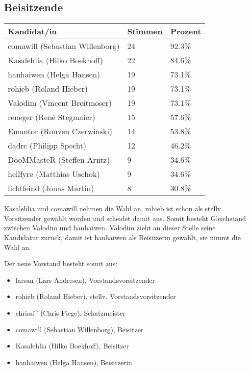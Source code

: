\documentclass[a4paper,12pt]{scrartcl}
\begin{document}
\subsection*{Beisitzende}
\begin{tabular}{|l|l|l|}
  \hline
  \textbf{Kandidat/in} & \textbf{Stimmen} & \textbf{Prozent} \\ \hline
  comawill (Sebastian Willenborg) & 24 & 92.3\% \\
  Kasalehlia (Hilko Boekhoff) & 22 & 84.6\% \\
  hanhaiwen (Helga Hansen) & 19 & 73.1\% \\
  rohieb (Roland Hieber) & 19 & 73.1\% \\
  Valodim (Vincent Breitmoser) & 19 & 73.1\% \\
  reneger (René Stegmaier) & 15 & 57.6\% \\
  Emantor (Rouven Czerwinski) & 14 & 53.8\% \\
  dadrc (Philipp Specht) & 12 & 46.2\% \\
  DooMMasteR (Steffen Arntz) & 9 & 34.6\% \\
  hellfyre (Matthias Uschok) & 9 & 34.6\% \\
  lichtfeind (Jonas Martin) & 8 & 30.8\% \\
  \hline
\end{tabular}

Kasalehlia und comawill nehmen die Wahl an, rohieb ist schon als stellv.
Vorsitzender gewählt worden und scheidet damit aus. Somit besteht Gleichstand
zwischen Valodim und hanhaiwen. Valodim zieht an dieser Stelle seine Kandidatur
zurück, damit ist hanhaiwen als Beisitzerin gewählt, sie nimmt die Wahl an.

Der neue Vorstand besteht somit aus:
\begin{itemize}
  \item larsan (Lars Andresen), Vorstandsvorsitzender
  \item rohieb (Roland Hieber), stellv. Vorstandsvorsitzender
  \item chrissi\textasciicircum{} (Chris Fiege), Schatzmeister
  \item comawill (Sebastian Willenborg), Beisitzer
  \item Kasalehlia (Hilko Boekhoff), Beisitzer
  \item hanhaiwen (Helga Hansen), Beisitzerin
\end{itemize}
\end{document}
